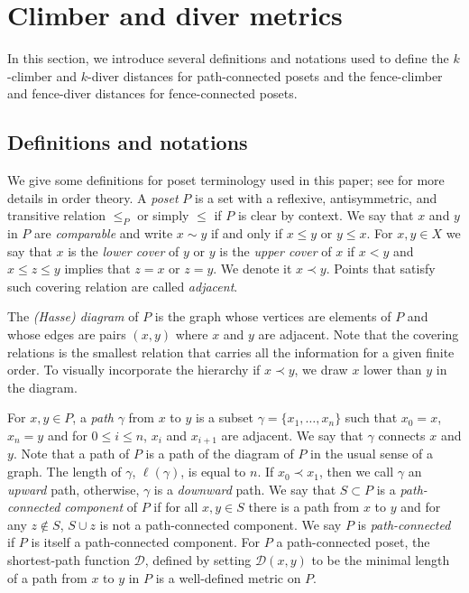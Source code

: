 \documentclass{article}[12pt]
\theoremstyle{exampstyle}
\theoremstyle{remark}
\newcommand{\D}{\mathcal{D}}
\newcommand{\tuple}[3][1]{#2_{#1}, \dots , #2_{#3}}
\begin{document}
\section{Climber and diver metrics}
\label{Sec:k-distances}

In this section, we introduce several definitions and notations used to define the $k$-climber and $k$-diver distances for path-connected posets and the fence-climber and fence-diver distances for fence-connected posets.

\subsection{Definitions and notations}

We give some definitions for poset terminology used in this paper; see \cite{Schroder} for more details in order theory. A \textit{poset} $P$ is a set with a reflexive, antisymmetric, and transitive relation $\leq_P$ or simply $\leq$ if $P$ is clear by context.
We say that $x$ and $y$ in $P$ are \textit{comparable} and write $x \sim y$ if and only if $x \leq y$ or $y \leq x$. For $x,y \in X$ we say that  $x$ is the \textit{lower cover} of  $y$ or $y$ is the \textit{upper cover} of $x$ if $x < y$ and $x \leq z \leq y$ implies that $z =x$ or $z =y$. We denote it $x \prec y$. Points that satisfy such covering relation are called \textit{adjacent}.

The \textit{(Hasse) diagram} of $P$ is the graph whose vertices are elements of $P$ and whose edges are pairs $(x,y)$ where $x$ and $y$ are adjacent. Note that the covering relations is the smallest relation that carries all the information for a given finite order. To visually incorporate the hierarchy if $x \prec y$, we draw $x$ lower than $y$ in the diagram. 

For $x,y \in P$, a \textit{path} $\gamma$ from $x$ to $y$ is a subset $\gamma = \{ \tuple{x}{n}\}$ such that $x_0 = x$, $x_n =y$ and for $ 0 \leq i \leq n$, $x_i$ and $x_{i+1}$ are adjacent. We say that $\gamma$ connects $x$ and $y$. Note that a path of $P$ is a path of the diagram of $P$ in the usual sense of a graph.  The length of $\gamma$, $\ell(\gamma)$, is equal to $n$. If $x_0 \prec x_1$, then we call $\gamma$ an \textit{upward} path, otherwise, $\gamma$ is a \textit{downward} path. We say that $S \subset P$ is a \textit{path-connected component} of $P$ if for all $x,y \in S$ there is a path from $x$ to $y$ and for any $z \notin S$, $S \cup {z}$  is not a path-connected component. We say $P$ is \textit{path-connected} if $P$ is itself a path-connected component. For $P$ a path-connected poset, the shortest-path function $\D$, defined by setting $\D(x,y)$ to be the minimal length of a path from $x$ to $y$ in $P$ is a well-defined metric on $P$.
\end{document}
